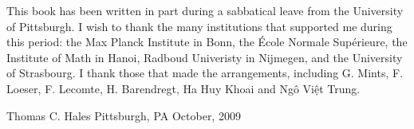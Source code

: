 This book has been written in part during a sabbatical leave from the
University of Pittsburgh.  I wish to thank the many institutions that
supported me during this period: the Max Planck Institute in Bonn, the
\'Ecole Normale Sup\'erieure, the Institute of Math in Hanoi, Radboud
Univeristy in Nijmegen, and the University of Strasbourg.  I thank
those that made the arrangements, including G. Mints, F. Loeser,
F. Lecomte, H. Barendregt, Ha Huy Khoai and Ng\^o Vi\d{\^e}t Trung.


\bigskip
\hbox{}



\bigskip
\hbox{}

{
\parindent=0pt
\obeylines

Thomas C. Hales
Pittsburgh, PA
October, 2009

}







